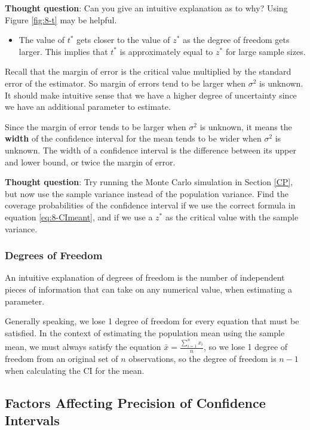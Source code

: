 \documentclass[
]{book}
\providecommand{\tightlist}{%
  \setlength{\itemsep}{0pt}\setlength{\parskip}{0pt}}
\theoremstyle{definition}
\theoremstyle{definition}
\theoremstyle{definition}
\theoremstyle{definition}
\theoremstyle{remark}
\begin{document}
\textbf{Thought question}: Can you give an intuitive explanation as to why? Using Figure \ref{fig:8-t} may be helpful.

\begin{itemize}
\tightlist
\item
  The value of \(t^*\) gets closer to the value of \(z^*\) as the degree of freedom gets larger. This implies that \(t^*\) is approximately equal to \(z^*\) for large sample sizes.
\end{itemize}

Recall that the margin of error is the critical value multiplied by the standard error of the estimator. So margin of errors tend to be larger when \(\sigma^2\) is unknown. It should make intuitive sense that we have a higher degree of uncertainty since we have an additional parameter to estimate.

Since the margin of error tends to be larger when \(\sigma^2\) is unknown, it means the \textbf{width} of the confidence interval for the mean tends to be wider when \(\sigma^2\) is unknown. The width of a confidence interval is the difference between its upper and lower bound, or twice the margin of error.

\textbf{Thought question}: Try running the Monte Carlo simulation in Section \ref{CP}, but now use the sample variance instead of the population variance. Find the coverage probabilities of the confidence interval if we use the correct formula in equation \eqref{eq:8-CImeant}, and if we use a \(z^*\) as the critical value with the sample variance.

\hypertarget{df}{%
\subsubsection{Degrees of Freedom}\label{df}}

An intuitive explanation of degrees of freedom is the number of independent pieces of information that can take on any numerical value, when estimating a parameter.

Generally speaking, we lose 1 degree of freedom for every equation that must be satisfied. In the context of estimating the population mean using the sample mean, we must always satisfy the equation \(\bar{x} = \frac{\sum_{i=1}^n x_i}{n}\), so we lose 1 degree of freedom from an original set of \(n\) observations, so the degree of freedom is \(n-1\) when calculating the CI for the mean.

\hypertarget{factors-affecting-precision-of-confidence-intervals}{%
\subsection{Factors Affecting Precision of Confidence Intervals}\label{factors-affecting-precision-of-confidence-intervals}}
\end{document}
